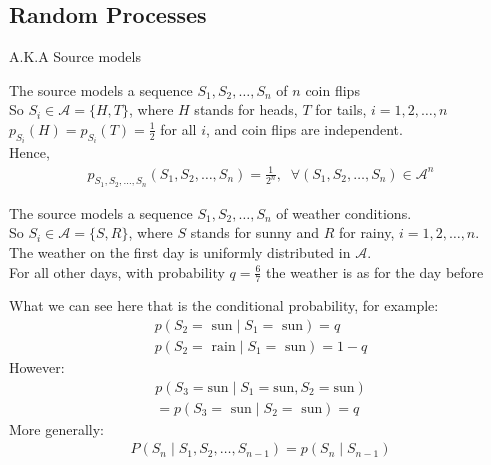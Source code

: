 \subsection{Random Processes}
\begin{parag}{A.K.A Source models}
    \begin{definition}
        The source models a sequence $S_1, S_2, \dots, S_n$ of $n$ coin flips\\
        So $S_i \in \mathcal{A} = \{H, T\}$, where $H$ stands for heads, $T$ for tails, $i = 1, 2, \dots, n$ \\
        $p_{S_i}(H) = p_{S_i}(T) = \frac{1}{2}$ for all $i$, and coin flips are independent.\\
     Hence,
     \begin{align*}
         p_{S_1, S_2, \dots, S_n}(S_1, S_2, \dots, S_n) = \frac{1}{2^n}, \; \; \forall (S_1, S_2, \dots, S_n) \in \mathcal{A}^n
     \end{align*}
     
    \end{definition}
\begin{definition}
    The source models a sequence $S_1, S_2, \dots, S_n$ of weather conditions.
    \\
    So $S_i \in \mathcal{A} = \{S, R\}$, where $S$ stands for sunny and $R$ for rainy, $i = 1, 2, \dots, n$. \\
    The weather on the first day is uniformly distributed in $ \mathcal{A}$. \\
    For all other days, with probability $q = \frac{6}{7}$ the weather is as for the day before
\end{definition}
What we can see here that is the conditional probability, for example:
\begin{align*}
    p(S_2 = \text{ sun} \mid S_1 = \text{ sun}) = q \\
    p(S_2 = \text{ rain} \mid  S_1 = \text{ sun}) = 1 - q
\end{align*} 
However:
\begin{align*}
   p(S_3 = \text{sun} \mid S_1 = \text{sun}, S_2 = \text{sun})\\
   = p(S_3 = \text{ sun} \mid S_2 = \text{ sun}) = q
\end{align*}
More generally:
\begin{align*}
    P(S_n \mid  S_1, S_2, \dots, S_{n-1}) = p(S_n \mid  S_{n-1})
\end{align*}


    

\end{parag}


